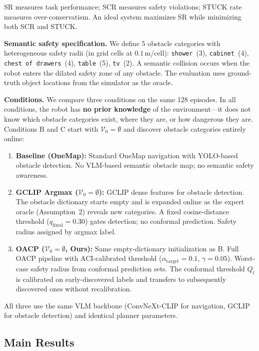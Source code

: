 \documentclass[letterpaper, 10 pt, conference]{ieeeconf}  %
\begin{document}
SR measures task performance; SCR measures safety violations; STUCK rate measures over-conservatism. An ideal system maximizes SR while minimizing both SCR and STUCK.

\textbf{Semantic safety specification.}
We define 5 obstacle categories with heterogeneous safety radii (in grid cells at $0.1$\,m/cell): \texttt{shower}~(3), \texttt{cabinet}~(4), \texttt{chest of drawers}~(4), \texttt{table}~(5), \texttt{tv}~(2). A semantic collision occurs when the robot enters the dilated safety zone of any obstacle. The evaluation uses ground-truth object locations from the simulator as the oracle.

\textbf{Conditions.}
We compare three conditions on the same 128 episodes. In all conditions, the robot has \textbf{no prior knowledge} of the environment---it does not know which obstacle categories exist, where they are, or how dangerous they are. Conditions B and C start with $\mathcal{V}_0 = \emptyset$ and discover obstacle categories entirely online:
\begin{enumerate}
    \item[\textbf{A.}] \textbf{Baseline (OneMap):} Standard OneMap \cite{reed2024onemap} navigation with YOLO-based obstacle detection. No VLM-based semantic obstacle map; no semantic safety awareness.
    \item[\textbf{B.}] \textbf{GCLIP Argmax ($\mathcal{V}_0 = \emptyset$):} GCLIP dense features for obstacle detection. The obstacle dictionary starts empty and is expanded online as the expert oracle (Assumption~2) reveals new categories. A fixed cosine-distance threshold ($q_{\text{fixed}} = 0.30$) gates detection; no conformal prediction. Safety radius assigned by argmax label.
    \item[\textbf{C.}] \textbf{OACP ($\mathcal{V}_0 = \emptyset$, Ours):} Same empty-dictionary initialization as B. Full OACP pipeline with ACI-calibrated threshold ($\alpha_{\text{target}} = 0.1$, $\gamma = 0.05$). Worst-case safety radius from conformal prediction sets. The conformal threshold $Q_t$ is calibrated on early-discovered labels and transfers to subsequently discovered ones without recalibration.
\end{enumerate}
All three use the same VLM backbone (ConvNeXt-CLIP for navigation, GCLIP for obstacle detection) and identical planner parameters.

\subsection{Main Results}
\end{document}
